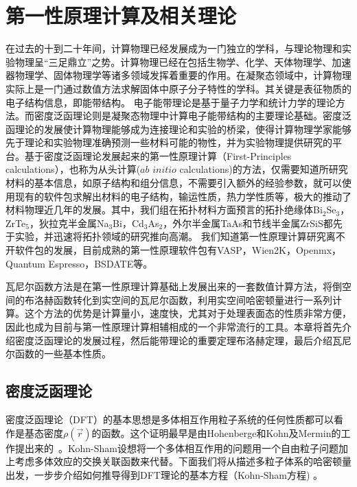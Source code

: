 \chapter{第一性原理计算及相关理论}\label{chap:first}
在过去的十到二十年间，计算物理已经发展成为一门独立的学科，与理论物理和实验物理呈“三足鼎立”之势。计算物理已经在包括生物学、化学、天体物理学、加速器物理学、固体物理学等诸多领域发挥着重要的作用。在凝聚态领域中，计算物理实际上是一门通过数值方法求解固体中原子分子特性的学科。其关键是表征物质的电子结构信息，即能带结构。
电子能带理论是基于量子力学和统计力学的理论方法。而密度泛函理论则是凝聚态物理中计算电子能带结构的主要理论基础。密度泛函理论的发展使计算物理能够成为连接理论和实验的桥梁，使得计算物理学家能够先于理论和实验物理准确预测一些材料可能的物性，并为实验物理提供研究的平台。基于密度泛函理论发展起来的第一性原理计算（First-Principles calculations），也称为从头计算($\textit{ab initio}$ calculations)的方法，仅需要知道所研究材料的基本信息，如原子结构和组分信息，不需要引入额外的经验参数，就可以使用现有的软件包求解出材料的电子结构，输运性质，热力学性质等，极大的推动了材料物理近几年的发展。其中，我们组在拓扑材料方面预言的拓扑绝缘体Bi$_2$Se$_3$，ZrTe$_5$，狄拉克半金属Na$_3$Bi，Cd$_3$As$_2$，外尔半金属TaAs和节线半金属ZrSiS都先于实验，并迅速将拓扑领域的研究推向高潮。
我们知道第一性原理计算研究离不开软件包的发展，目前成熟的第一性原理软件包有VASP，Wien2K，Openmx，Quantum Espresso，BSDATE等。

瓦尼尔函数方法是在第一性原理计算基础上发展出来的一套数值计算方法，将倒空间的布洛赫函数转化到实空间的瓦尼尔函数，利用实空间哈密顿量进行一系列计算。这个方法的优势是计算量小，速度快，尤其对于处理表面态的性质非常方便，因此也成为目前与第一性原理计算相辅相成的一个非常流行的工具。本章将首先介绍密度泛函理论的发展过程，然后能带理论的重要定理布洛赫定理，最后介绍瓦尼尔函数的一些基本性质。

\section{密度泛函理论}
密度泛函理论（DFT）的基本思想是多体相互作用粒子系统的任何性质都可以看作是基态密度$\rho(\vec{r})$的函数。这个证明最早是由Hohenberge和Kohn及Mermin的工作提出来的~\citep{Hohenberg1964,Mermin65}。Kohn-Sham设想将一个多体相互作用的问题用一个自由粒子问题加上考虑多体效应的交换关联函数来代替。下面我们将从描述多粒子体系的哈密顿量出发，一步步介绍如何推导得到DFT理论的基本方程（Kohn-Sham方程) 。 

